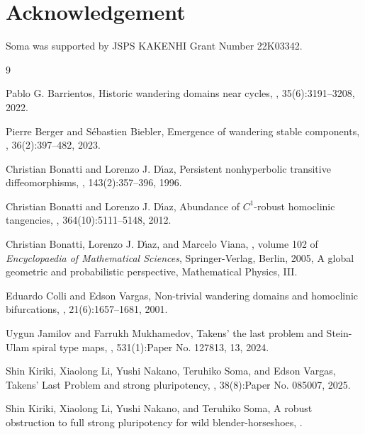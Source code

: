 \documentclass{amsart}
\theoremstyle{plain}
\theoremstyle{definition}
\numberwithin{equation}{section}
\numberwithin{figure}{section}
\begin{document}
\section*{Acknowledgement}
Soma was supported by JSPS KAKENHI Grant Number 22K03342.


\begin{thebibliography}{9}

Pablo G. Barrientos, 
\newblock Historic wandering domains near cycles, 
, 35(6):3191--3208, 2022.

Pierre Berger and S\'{e}bastien Biebler, 
\newblock Emergence of wandering stable components, 
, 36(2):397--482, 2023.


Christian Bonatti and Lorenzo J. D{\'{\i}}az, 
\newblock Persistent nonhyperbolic transitive diffeomorphisms, 
, 143(2):357--396, 1996.


Christian Bonatti and Lorenzo J. D{\'{\i}}az, 
\newblock Abundance of {$C^1$}-robust homoclinic tangencies, 
, 364(10):5111--5148, 2012.


Christian Bonatti, Lorenzo J. D{\'{\i}}az, and Marcelo Viana, 
, volume 102 of {\em
  Encyclopaedia of Mathematical Sciences}, 
\newblock Springer-Verlag, Berlin, 2005, 
\newblock A global geometric and probabilistic perspective, Mathematical Physics, III.


Eduardo Colli and Edson Vargas, 
\newblock Non-trivial wandering domains and homoclinic bifurcations, 
, 21(6):1657--1681, 2001.


Uygun Jamilov and Farrukh Mukhamedov, 
\newblock Takens' the last problem and {S}tein-{U}lam spiral type maps, 
, 531(1):Paper No. 127813, 13, 2024.



Shin Kiriki, Xiaolong Li, Yushi Nakano, Teruhiko Soma, and Edson Vargas, 
\newblock Takens' {L}ast {P}roblem and strong pluripotency, 
, 38(8):Paper No. 085007, 2025.

Shin Kiriki, Xiaolong Li, Yushi Nakano, and Teruhiko Soma, 
\newblock A robust obstruction to full strong pluripotency for wild blender-horseshoes, 
.


\end{thebibliography}
\end{document}
